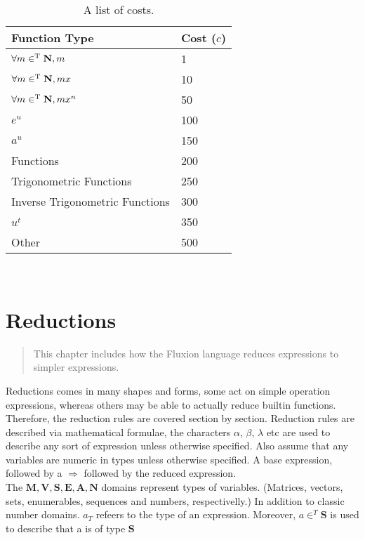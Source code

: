 \documentclass[11pt,a4paper]{book}
\begin{document}
\begin{table}[httb]
\label{tab:costs}
\begin{tabular}{ll}
\toprule
Function Type & Cost ($c$) \\
\midrule
$\forall m \in^\text{T} \mathbf{N}, m$ & 1\\
$\forall m \in^\text{T} \mathbf{N}, mx$ & 10\\
$\forall m \in^\text{T} \mathbf{N}, mx^n$ &  50\\
$e^u$ & 100 \\
$a^u$ & 150 \\
Functions & 200 \\
Trigonometric Functions & 250 \\
Inverse Trigonometric Functions & 300 \\
$u^t$ & 350 \\
Other & 500\\
\bottomrule
\end{tabular}
\caption{A list of costs.}
\end{table}

\



\chapter{Reductions}

\vspace{1em}
\begin{quotation}
This chapter includes how the Fluxion language reduces expressions to simpler expressions.
\end{quotation}
\newpage

Reductions comes in many shapes and forms, some act on simple operation expressions, whereas others may be able to actually reduce builtin functions. Therefore, the reduction rules are covered section by section. Reduction rules are described via mathematical formulae, the characters $\alpha$, $\beta$, $\lambda$ etc are used to describe any sort of expression unless otherwise specified. Also assume that any variables are numeric in types unless otherwise specified. A base expression, followed by a $\Rightarrow$ followed by the reduced expression. \\

The $\mathbf{M}, \mathbf{V}, \mathbf{S}, \mathbf{E}, \mathbf{A}, \mathbf{N}$ domains represent types of variables. (Matrices, vectors, sets, enumerables, sequences and numbers, respectivelly.) In addition to classic number domains. $a_T$ refeers to the type of an expression. Moreover, $a \in^T \mathbf{S}$ is used to describe that a is of type $\mathbf{S}$ \\
\end{document}
